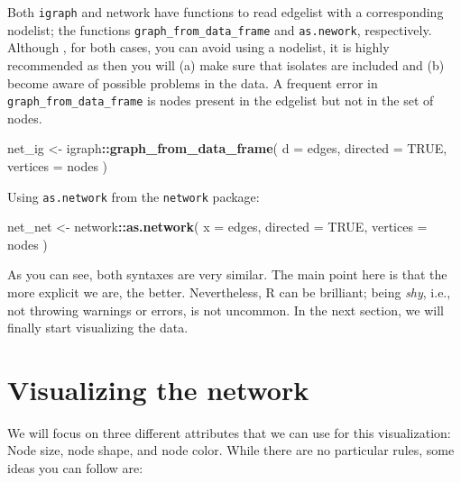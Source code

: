 \documentclass[
]{book}
\newenvironment{Shaded}{\begin{snugshade}}{\end{snugshade}}
\newcommand{\AttributeTok}[1]{\textcolor[rgb]{0.13,0.29,0.53}{#1}}
\newcommand{\ConstantTok}[1]{\textcolor[rgb]{0.56,0.35,0.01}{#1}}
\newcommand{\FunctionTok}[1]{\textcolor[rgb]{0.13,0.29,0.53}{\textbf{#1}}}
\newcommand{\NormalTok}[1]{#1}
\newcommand{\OtherTok}[1]{\textcolor[rgb]{0.56,0.35,0.01}{#1}}
\newcommand{\SpecialCharTok}[1]{\textcolor[rgb]{0.81,0.36,0.00}{\textbf{#1}}}
\begin{document}
Both \texttt{igraph} and network have functions to read edgelist with a corresponding
nodelist; the functions \texttt{graph\_from\_data\_frame} and \texttt{as.nework}, respectively. Although
, for both cases, you can avoid using a nodelist, it is highly recommended as then
you will (a) make sure that isolates are included and (b) become aware of possible
problems in the data. A frequent error in \texttt{graph\_from\_data\_frame} is nodes present
in the edgelist but not in the set of nodes.

\begin{Shaded}
\begin{Highlighting}[]
\NormalTok{net\_ig }\OtherTok{\textless{}{-}}\NormalTok{ igraph}\SpecialCharTok{::}\FunctionTok{graph\_from\_data\_frame}\NormalTok{(}
  \AttributeTok{d        =}\NormalTok{ edges,}
  \AttributeTok{directed =} \ConstantTok{TRUE}\NormalTok{,}
  \AttributeTok{vertices =}\NormalTok{ nodes}
\NormalTok{)}
\end{Highlighting}
\end{Shaded}

Using \texttt{as.network} from the \texttt{network} package:

\begin{Shaded}
\begin{Highlighting}[]
\NormalTok{net\_net }\OtherTok{\textless{}{-}}\NormalTok{ network}\SpecialCharTok{::}\FunctionTok{as.network}\NormalTok{(}
  \AttributeTok{x        =}\NormalTok{ edges,}
  \AttributeTok{directed =} \ConstantTok{TRUE}\NormalTok{,}
  \AttributeTok{vertices =}\NormalTok{ nodes}
\NormalTok{)}
\end{Highlighting}
\end{Shaded}

As you can see, both syntaxes are very similar. The main point here is that the
more explicit we are, the better. Nevertheless, R can be brilliant; being
\emph{shy}, i.e., not throwing warnings or errors, is not uncommon. In the next
section, we will finally start visualizing the data.

\hypertarget{visualizing-the-network}{%
\section{Visualizing the network}\label{visualizing-the-network}}

We will focus on three different attributes that we can use for this visualization:
Node size, node shape, and node color. While there are no particular rules, some
ideas you can follow are:
\end{document}
